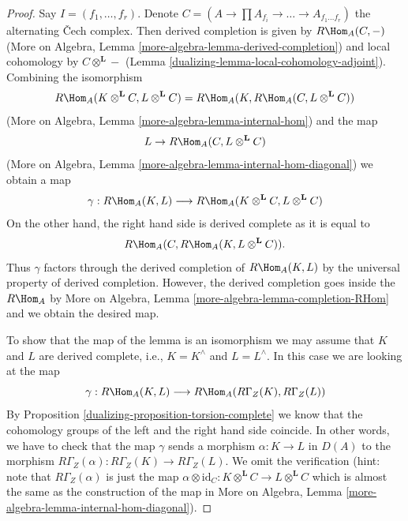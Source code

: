 \begin{proof}

Say $I = (f_1, \ldots, f_r)$. Denote
$C = (A \to \prod A_{f_i} \to \ldots \to A_{f_1 \ldots f_r})$ the
alternating {\v C}ech complex. Then derived completion is given by
$R\Hom_A(C, -)$ (More on Algebra, Lemma
\ref{more-algebra-lemma-derived-completion}) and local cohomology by
$C \otimes^\mathbf{L} -$ (Lemma \ref{dualizing-lemma-local-cohomology-adjoint}).
Combining the isomorphism
$$
R\Hom_A(K \otimes^\mathbf{L} C, L \otimes^\mathbf{L} C) =
R\Hom_A(K, R\Hom_A(C,  L \otimes^\mathbf{L} C))
$$
(More on Algebra, Lemma \ref{more-algebra-lemma-internal-hom})
and the map
$$
L \to R\Hom_A(C,  L \otimes^\mathbf{L} C)
$$
(More on Algebra, Lemma \ref{more-algebra-lemma-internal-hom-diagonal})
we obtain a map
$$
\gamma :
R\Hom_A(K, L)
\longrightarrow
R\Hom_A(K \otimes^\mathbf{L} C, L \otimes^\mathbf{L} C)
$$
On the other hand, the right hand side is derived complete as it is
equal to
$$
R\Hom_A(C, R\Hom_A(K, L \otimes^\mathbf{L} C)).
$$
Thus $\gamma$ factors through the derived completion of
$R\Hom_A(K, L)$ by the universal property of derived completion.
However, the derived completion goes inside the $R\Hom_A$ by
More on Algebra, Lemma \ref{more-algebra-lemma-completion-RHom}
and we obtain the desired map.

\medskip\noindent
To show that the map of the lemma is an isomorphism
we may assume that $K$ and $L$ are derived complete, i.e.,
$K = K^\wedge$ and $L = L^\wedge$. In this case we are
looking at the map
$$
\gamma : R\Hom_A(K, L) \longrightarrow R\Hom_A(R\Gamma_Z(K), R\Gamma_Z(L))
$$
By Proposition \ref{dualizing-proposition-torsion-complete} we know that
the cohomology groups
of the left and the right hand side coincide. In other words,
we have to check that the map $\gamma$ sends a morphism
$\alpha : K \to L$ in $D(A)$ to the morphism
$R\Gamma_Z(\alpha) : R\Gamma_Z(K) \to R\Gamma_Z(L)$.
We omit the verification (hint: note that $R\Gamma_Z(\alpha)$
is just the map
$\alpha \otimes \text{id}_C :
K \otimes^\mathbf{L} C
\to
L \otimes^\mathbf{L} C$ which is almost the same as the
construction of the map in
More on Algebra, Lemma \ref{more-algebra-lemma-internal-hom-diagonal}).
\end{proof}

